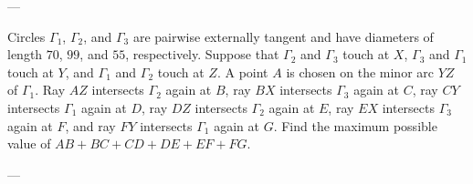 
---

Circles $\Gamma_1$, $\Gamma_2$, and $\Gamma_3$ are pairwise externally tangent and have diameters of length $70$, $99$, and $55$, respectively. Suppose that $\Gamma_2$ and $\Gamma_3$ touch at $X$, $\Gamma_3$ and $\Gamma_1$ touch at $Y$, and $\Gamma_1$ and $\Gamma_2$ touch at $Z$. A point $A$ is chosen on the minor arc $YZ$ of $\Gamma_1$. Ray $AZ$ intersects $\Gamma_2$ again at $B$, ray $BX$ intersects $\Gamma_3$ again at $C$, ray $CY$ intersects $\Gamma_1$ again at $D$, ray $DZ$ intersects $\Gamma_2$ again at $E$, ray $EX$ intersects $\Gamma_3$ again at $F$, and ray $FY$ intersects $\Gamma_1$ again at $G$. Find the maximum possible value of $AB+BC+CD+DE+EF+FG$.

---

